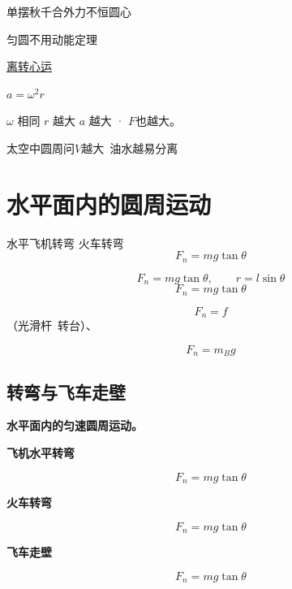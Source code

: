 单摆秋千合外力不恒圆心

匀圆不用动能定理

\underline{离转心运}%

$a=\omega^2 r$

$\omega$ 相同 $r$ 越大 $a$ 越大 · $F$也越大。%

太空中圆周问\quad $V$越大\ 油水越易分离


\section{水平面内的圆周运动}
水平飞机转弯
火车转弯
\[ F_n=mg\tan\theta \]

\[ F_n=mg\tan\theta,\qquad r=l\sin\theta \]
\[ F_n=mg\tan\theta \]

\[ F_n=f \]
（光滑杆\ 转台）、\par
\[ F_n=m_Bg \]

\subsection{转弯与飞车走壁}
\textbf{水平面内的匀速圆周运动。}

\textbf{飞机水平转弯}


\[ F_n=mg\tan\theta \]

\textbf{火车转弯}


\[ F_n=mg\tan\theta \]

\textbf{飞车走壁}


\[ F_n=mg\tan\theta \]

